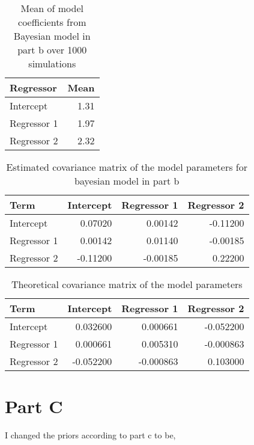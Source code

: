 \documentclass[]{book}
\begin{document}
\begin{table}

\caption{\label{tab:bayes-b-mean-coefs-q3}Mean of model coefficients from Bayesian model in part b over 1000 simulations}
\centering
\begin{tabular}[t]{lr}
\toprule
Regressor & Mean\\
\midrule
Intercept & 1.31\\
Regressor 1 & 1.97\\
Regressor 2 & 2.32\\
\bottomrule
\end{tabular}
\end{table}

\begin{table}

\caption{\label{tab:bayes-b-est-vcov-q3}Estimated covariance matrix of the model parameters for bayesian model in part b}
\centering
\begin{tabular}[t]{lrrr}
\toprule
Term & Intercept & Regressor 1 & Regressor 2\\
\midrule
Intercept & 0.07020 & 0.00142 & -0.11200\\
Regressor 1 & 0.00142 & 0.01140 & -0.00185\\
Regressor 2 & -0.11200 & -0.00185 & 0.22200\\
\bottomrule
\end{tabular}
\end{table}

\begin{table}

\caption{\label{tab:theory-vcov-b-q3}Theoretical covariance matrix of the model parameters}
\centering
\begin{tabular}[t]{lrrr}
\toprule
Term & Intercept & Regressor 1 & Regressor 2\\
\midrule
Intercept & 0.032600 & 0.000661 & -0.052200\\
Regressor 1 & 0.000661 & 0.005310 & -0.000863\\
Regressor 2 & -0.052200 & -0.000863 & 0.103000\\
\bottomrule
\end{tabular}
\end{table}

\hypertarget{part-c-2}{%
\section{Part C}\label{part-c-2}}

I changed the priors according to part c to be,
\end{document}
